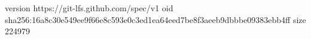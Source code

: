 version https://git-lfs.github.com/spec/v1
oid sha256:16a8c30e549ee9f66e8c593e0c3ed1ea64eed7be8f3aeeb9dbbbe09383ebb4ff
size 224979
